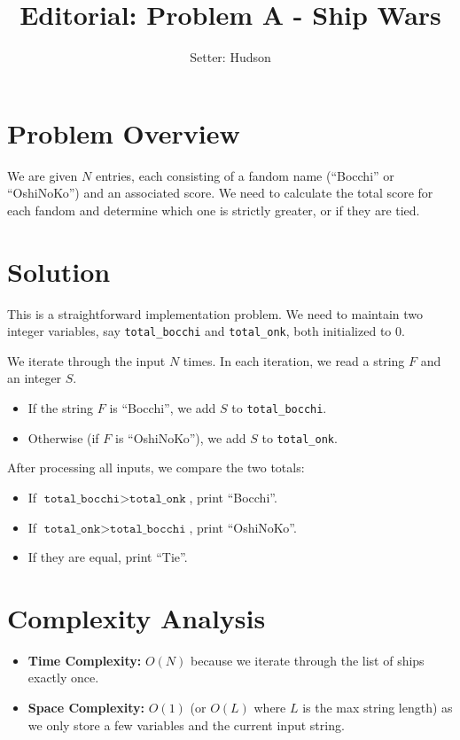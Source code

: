 \documentclass[11pt]{article}
\title{\textbf{Editorial: Problem A - Ship Wars}}
\author{Setter: Hudson}
\date{}
\begin{document}
\maketitle

\section*{Problem Overview}
We are given $N$ entries, each consisting of a fandom name (``Bocchi'' or ``OshiNoKo'') and an associated score. We need to calculate the total score for each fandom and determine which one is strictly greater, or if they are tied.

\section*{Solution}
This is a straightforward implementation problem. We need to maintain two integer variables, say \texttt{total\_bocchi} and \texttt{total\_onk}, both initialized to 0.

We iterate through the input $N$ times. In each iteration, we read a string $F$ and an integer $S$.
\begin{itemize}
    \item If the string $F$ is ``Bocchi'', we add $S$ to \texttt{total\_bocchi}.
    \item Otherwise (if $F$ is ``OshiNoKo''), we add $S$ to \texttt{total\_onk}.
\end{itemize}

After processing all inputs, we compare the two totals:
\begin{itemize}
    \item If $\texttt{total\_bocchi} > \texttt{total\_onk}$, print ``Bocchi''.
    \item If $\texttt{total\_onk} > \texttt{total\_bocchi}$, print ``OshiNoKo''.
    \item If they are equal, print ``Tie''.
\end{itemize}

\section*{Complexity Analysis}
\begin{itemize}
    \item \textbf{Time Complexity:} $O(N)$ because we iterate through the list of ships exactly once.
    \item \textbf{Space Complexity:} $O(1)$ (or $O(L)$ where $L$ is the max string length) as we only store a few variables and the current input string.
\end{itemize}
\end{document}
